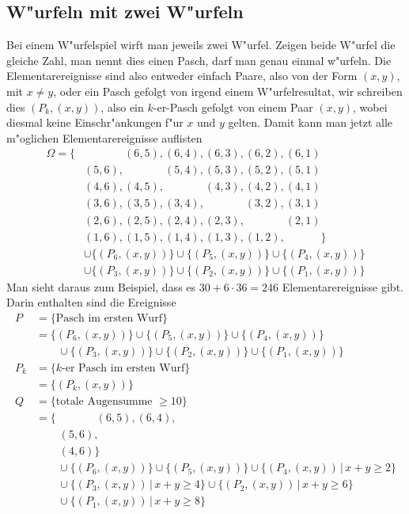 \subsection{W"urfeln mit zwei W"urfeln}
Bei einem W"urfelspiel wirft man jeweils zwei W"urfel. Zeigen beide W"urfel
die gleiche Zahl, man nennt dies einen Pasch, darf man genau einmal w"urfeln.
Die Elementarereignisse sind also entweder einfach Paare, also von
der Form $(x,y)$, mit $x\ne y$, oder ein Pasch gefolgt von irgend einem
W"urfelresultat, wir schreiben dies $(P_k, (x,y))$, also ein $k$-er-Pasch
gefolgt von einem Paar $(x,y)$, wobei diesmal keine Einschr"ankungen f"ur
$x$ und $y$ gelten.
Damit kann man jetzt alle m"oglichen Elementarereignisse auflisten
\begin{align*}
\Omega=\{
&\phantom{(6,6),} (6,5), (6,4), (6,3), (6,2), (6,1)\\
&(5,6), \phantom{(5,5),} (5,4), (5,3), (5,2), (5,1)\\
&(4,6), (4,5), \phantom{(4,4),} (4,3), (4,2), (4,1)\\
&(3,6), (3,5), (3,4), \phantom{(3,3),} (3,2), (3,1)\\
&(2,6), (2,5), (2,4), (2,3), \phantom{(2,2),} (2,1)\\
&(1,6), (1,5), (1,4), (1,3), (1,2), \phantom{(1,1)}
\}
\\
&\cup
\{(P_6,(x,y))\}
\cup
\{(P_5,(x,y))\}
\cup
\{(P_4,(x,y))\}
\\
&\cup
\{(P_3,(x,y))\}
\cup
\{(P_2,(x,y))\}
\cup
\{(P_1,(x,y))\}
\end{align*}
Man sieht daraus zum Beispiel, dass es $30 + 6\cdot 36=246$
Elementarereignisse gibt. Darin enthalten sind die Ereignisse
\begin{align*}
P&=\{\text{Pasch im ersten Wurf}\}\\
&=
\{(P_6,(x,y))\}
\cup
\{(P_5,(x,y))\}
\cup
\{(P_4,(x,y))\}
\\
&\qquad \cup
\{(P_3,(x,y))\}
\cup
\{(P_2,(x,y))\}
\cup
\{(P_1,(x,y))\}
\\
P_k&=\{\text{$k$-er Pasch im ersten Wurf}\}\\
   &=\{(P_k,(x,y))\}
\\
Q&=\{\text{totale Augensumme $\ge 10$}\}\\
&=\{\phantom{(6,6),} (6,5), (6,4), \\
&\phantom{\;=\{}(5,6), \phantom{(5,5),} \\
&\phantom{\;=\{}(4,6)
\}
\\
&\qquad\cup
\{(P_6,(x,y))\}
\cup
\{(P_5,(x,y))\}
\cup
\{(P_4,(x,y))\,|\, x+y \ge 2\}
\\
&\qquad\cup
\{(P_3,(x,y))\,|\, x+y \ge 4\}
\cup
\{(P_2,(x,y))\,|\, x+y \ge 6\}
\\
&\qquad
\cup
\{(P_1,(x,y))\,|\, x+y \ge 8\}
\end{align*}

